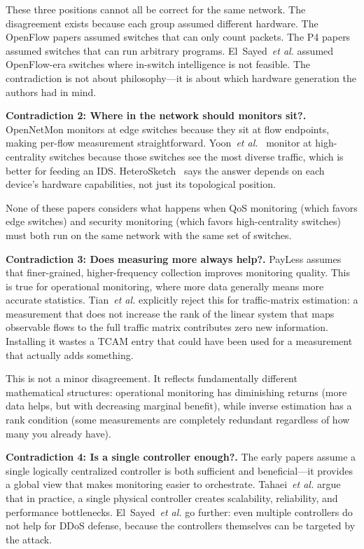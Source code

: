 \documentclass[letterpaper,twocolumn,10pt]{article}
\newcommand{\etal}{\textit{et al.}\xspace}
\newcommand{\para}[1]{\smallskip\noindent\textbf{#1.}}
\begin{document}
These three positions cannot all be correct for the same network.
The disagreement exists because each group assumed different
hardware. The OpenFlow papers assumed switches that can only
count packets. The P4 papers assumed switches that can run
arbitrary programs. El~Sayed~\etal assumed OpenFlow-era switches
where in-switch intelligence is not feasible. The contradiction
is not about philosophy---it is about which hardware generation
the authors had in mind.

\para{Contradiction 2: Where in the network should monitors sit?}
OpenNetMon monitors at edge switches because they sit at flow
endpoints, making per-flow measurement straightforward.
Yoon~\etal~\cite{yoon2017sampling} monitor at high-centrality
switches because those switches see the most diverse traffic,
which is better for feeding an IDS.
HeteroSketch~\cite{agarwal2022heterosketch} says the answer
depends on each device's hardware capabilities, not just its
topological position.

None of these papers considers what happens when QoS monitoring
(which favors edge switches) and security monitoring (which
favors high-centrality switches) must both run on the same
network with the same set of switches.

\para{Contradiction 3: Does measuring more always help?}
PayLess assumes that finer-grained, higher-frequency collection
improves monitoring quality. This is true for operational
monitoring, where more data generally means more accurate
statistics.
Tian~\etal\cite{tian2018trafficmatrix} explicitly reject this for
traffic-matrix estimation: a measurement that does not increase
the rank of the linear system that maps observable flows to the
full traffic matrix contributes zero new information. Installing
it wastes a TCAM entry that could have been used for a
measurement that actually adds something.

This is not a minor disagreement. It reflects fundamentally
different mathematical structures: operational monitoring has
diminishing returns (more data helps, but with decreasing
marginal benefit), while inverse estimation has a rank
condition (some measurements are completely redundant regardless
of how many you already have).

\para{Contradiction 4: Is a single controller enough?}
The early papers assume a single logically centralized controller
is both sufficient and beneficial---it provides a global view
that makes monitoring easier to orchestrate.
Tahaei~\etal\cite{tahaei2018distributed} argue that in practice,
a single physical controller creates scalability, reliability,
and performance bottlenecks.
El~Sayed~\etal\cite{elsayed2022ddos} go further: even multiple
controllers do not help for DDoS defense, because the
controllers themselves can be targeted by the attack.
\end{document}
